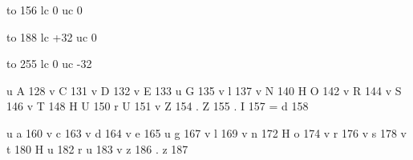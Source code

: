 

\startmapping[ec]


 to 156 lc 0 uc 0


 to 188 lc +32 uc 0


 to 255 lc 0 uc -32


\stopmapping

\startencoding[ec]

 u A 128
 v C 131
 v D 132
 v E 133
 u G 135
 v l 137 %
 v N 140
 H O 142
 v R 144
 v S 146
 v T 148
 H U 150
 r U 151
 v Z 154
 . Z 155
 . I 157
 = d 158

 u a 160
 v c 163
 v d 164
 v e 165
 u g 167
 v l 169
 v n 172
 H o 174
 v r 176
 v s 178
 v t 180
 H u 182
 r u 183
 v z 186
 . z 187

